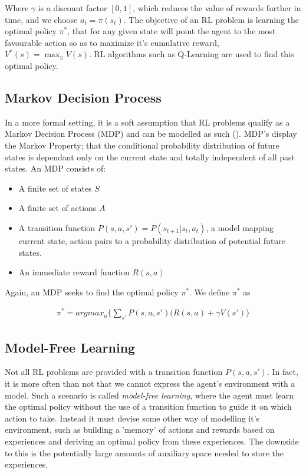 Where $\gamma$ is a discount factor $[0, 1]$, which reduces the value of rewards further in time, and we choose $a_t = \pi(s_t)$. The objective of an RL
problem is learning the optimal policy $\pi^*$, that for any given state will point the agent to the
most favourable action so as to maximize it's cumulative reward, $V^*(s) = \max_{\pi}V(s)$. RL
algorithms such as Q-Learning are used to find this optimal policy. \paragraph{}

\subsection{Markov Decision Process}
In a more formal setting, it is a soft assumption that RL problems qualify as a Markov Decision
Process (MDP) and can be modelled as such (\citet{survey-drl}). MDP's display the Markov Property; that
the conditional probability distribution of future states is dependant only on the current state and
totally independent of all past states. An MDP consists of:

\begin{itemize}
    \item A finite set of states $S$
    \item A finite set of actions $A$
    \item A transition function $P(s, a, s') = P(s_{t+1}|s_t, a_t)$, a model mapping current state,
          action pairs to a probability distribution of potential future states.
    \item An immediate reward function $R(s, a)$
\end{itemize}

Again, an MDP seeks to find the optimal policy $\pi^*$. We define $\pi^*$ as

\begin{align}
    \pi^* = argmax_a\{\sum_{s'}P(s, a, s')(R(s, a) + \gamma V(s')\}
\end{align}

\subsection{Model-Free Learning}
Not all RL problems are provided with a transition function $P(s, a, s')$. In fact, it is more often
than not that we cannot express the agent's environment with a model. Such a scenario is called
\textit{model-free learning}, where the agent must learn the optimal policy without the use of a
transition function to guide it on which action to take. Instead it must devise some other way of
modelling it's environment, such as building a 'memory' of actions and rewards based on experiences
and deriving an optimal policy from these experiences. The downside to this is the potentially large
amounts of auxiliary space needed to store the experiences. \paragraph{}


